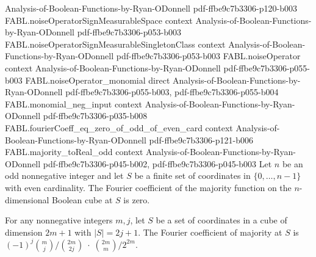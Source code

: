 \begin{theorem}
  {Analysis-of-Boolean-Functions-by-Ryan-ODonnell}
  {pdf-ffbe9c7b3306-p120-b003}
\proofstep
  {FABL.noiseOperatorSignMeasurableSpace}
  {context}
  {Analysis-of-Boolean-Functions-by-Ryan-ODonnell}
  {pdf-ffbe9c7b3306-p053-b003}
\proofstep
  {FABL.noiseOperatorSignMeasurableSingletonClass}
  {context}
  {Analysis-of-Boolean-Functions-by-Ryan-ODonnell}
  {pdf-ffbe9c7b3306-p053-b003}
\proofstep
  {FABL.noiseOperator}
  {context}
  {Analysis-of-Boolean-Functions-by-Ryan-ODonnell}
  {pdf-ffbe9c7b3306-p055-b003}
\proofstep
  {FABL.noiseOperator_monomial}
  {direct}
  {Analysis-of-Boolean-Functions-by-Ryan-ODonnell}
  {pdf-ffbe9c7b3306-p055-b003,
    pdf-ffbe9c7b3306-p055-b004}
\proofstep
  {FABL.monomial_neg_input}
  {context}
  {Analysis-of-Boolean-Functions-by-Ryan-ODonnell}
  {pdf-ffbe9c7b3306-p035-b008}
\proofstep
  {FABL.fourierCoeff_eq_zero_of_odd_of_even_card}
  {context}
  {Analysis-of-Boolean-Functions-by-Ryan-ODonnell}
  {pdf-ffbe9c7b3306-p121-b006}
\proofstep
  {FABL.majority_toReal_odd}
  {context}
  {Analysis-of-Boolean-Functions-by-Ryan-ODonnell}
  {pdf-ffbe9c7b3306-p045-b002,
    pdf-ffbe9c7b3306-p045-b003}
Let $n$ be an odd nonnegative integer and let $S$ be a finite set of coordinates in
$\{0,\ldots,n-1\}$ with even cardinality. The Fourier coefficient of the majority
function on the $n$-dimensional Boolean cube at $S$ is zero.
\end{theorem}

\begin{theorem}
\label{FABL.fourierCoeff_majority_two_mul_add_one}
\leanok
{}
For any nonnegative integers $m,j$, let $S$ be a set of coordinates in a cube of
dimension $2m+1$ with $|S|=2j+1$. The Fourier coefficient of majority at $S$ is
$(-1)^j\binom{m}{j}\big/\binom{2m}{2j}\;\cdot\;\binom{2m}{m}/2^{2m}$.
\end{theorem}

